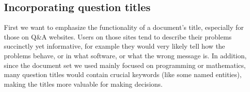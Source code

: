 \subsection{Incorporating question titles}
First we want to emphasize the functionality of a document's title, especially for those on Q\&A websites. Users on those sites tend to describe their problems succinctly yet informative, for example they would very likely tell how the problems behave, or in what software, or what the wrong message is. In addition, since the document set we used mainly focused on programming or mathematics, many question titles would contain crucial keywords (like some named entities), making the titles more valuable for making decisions.

\begin{figure}
\centering




\end{figure}
